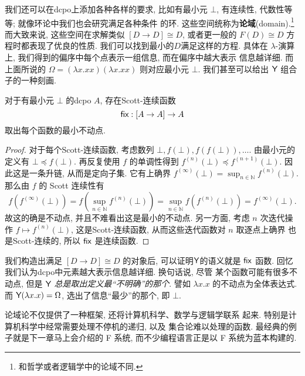 我们还可以在dcpo上添加各种各样的要求, 比如有最小元 \(\bot\),
有连续性, 代数性等等; 就像环论中我们也会研究满足各种条件
的环. 这些空间统称为\textbf{论域}(domain).\footnote{和哲学或者逻辑学中的论域不同.}
而大致来说, 这些空间在求解类似 \([D \to D] \cong D\),
或者更一般的 \(F(D) \cong D\) 方程时都表现了优良的性质.
我们可以找到最小的\(D\)满足这样的方程. 具体在 \(\lambda\)-演算
上, 我们得到的偏序中每个点表示一组信息, 而在偏序中越大表示
信息越详细. 而上面所说的 \(\Omega = (\lambda x. xx) (\lambda x.xx)\)
则对应最小元 \(\bot\). 我们甚至可以给出 \(\textsf{Y}\)
组合子的一种刻画.
\begin{lemma}
对于有最小元 \(\bot\) 的dcpo \(A\),
存在Scott-连续函数 \[\textsf{fix} : [A \to A] \to A\]
取出每个函数的最小不动点.
\end{lemma}
\begin{proof}
对于每个Scott-连续函数,
考虑数列 \(\bot, f(\bot), f(f(\bot)),\dots\).
由最小元的定义有 \(\bot \preceq f(\bot)\). 再反复使用
\(f\) 的单调性得到 \(f^{(n)}(\bot) \preceq f^{(n+1)}(\bot)\).
因此这是一条升链, 从而是定向子集. 它有上确界
\(f^{(\infty)}(\bot) = \sup_{n\in\mathbb N}f^{(n)}(\bot).\)
那么由 \(f\) 的 Scott 连续性有
\[f(f^{(\infty)}(\bot)) = f(\sup_{n\in\mathbb N}f^{(n)}(\bot))
= \sup_{n\in\mathbb N} f(f^{(n)}(\bot)) = f^{(\infty)}(\bot).\]
故这的确是不动点, 并且不难看出这是最小的不动点.
另一方面, 考虑 \(n\) 次迭代操作 \(f \mapsto f^{(n)}(\bot)\),
这是Scott-连续函数, 从而这些迭代函数对 \(n\) 取逐点上确界
也是Scott-连续的, 所以 \(\textsf{fix}\) 是连续函数.
\end{proof}

我们构造出满足 \([D \to D] \cong D\) 的对象后,
可以证明\(\textsf{Y}\)的语义就是 \(\textsf{fix}\) 函数.
回忆我们认为dcpo中元素越大表示信息越详细.
换句话说, 尽管
某个函数可能有很多不动点, 但是 \(\textsf{Y}\)
\emph{总是取出定义最“不明确”的那个}. 譬如 \(\lambda x.x\)
的不动点为全体表达式. 而 \(\textsf{Y}(\lambda x. x) = \Omega\),
选出了信息“最少”的那个, 即 \(\bot\).

论域论不仅提供了一种框架, 还将计算机科学、数学与逻辑学联系
起来. 特别是计算机科学中经常需要处理不停机的递归, 以及
集合论难以处理的函数. 最经典的例子就是下一章马上会介绍的
F 系统, 而不少编程语言正是以 F 系统为蓝本构建的.
